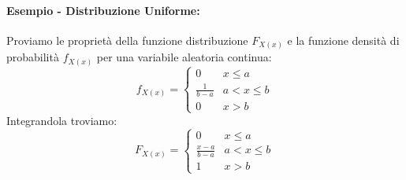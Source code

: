             \paragraph{Esempio - Distribuzione Uniforme:} 
                Proviamo le proprietà della funzione distribuzione $F_{X(x)}$ e la funzione densità di probabilità $f_{X(x)}$ per una variabile aleatoria
                continua:
                \[
                    f_{X(x)} = 
                    \begin{cases}
                        0 & x\leq a\nonumber \\
                        \frac{1}{b-a} & a<x\leq b\nonumber \\
                        0 & x>b\nonumber
                    \end{cases}  
                \]
                Integrandola troviamo:
                \[
                    F_{X(x)} = 
                    \begin{cases}
                        0 & x\leq a\nonumber \\
                        \frac{x-a}{b-a} & a<x\leq b\nonumber \\
                        1 & x>b\nonumber
                    \end{cases}  
                \]
